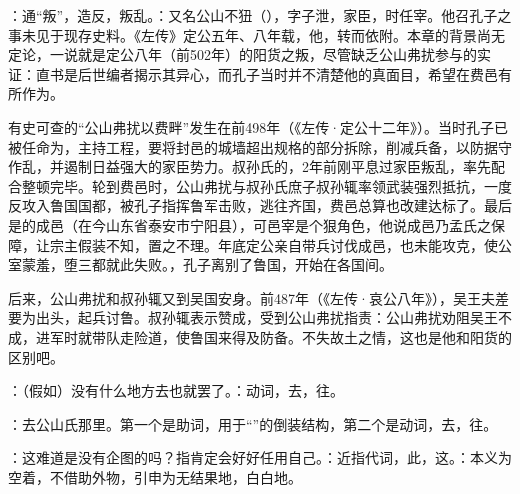 {
\begin{lyblobitemize}
\item {}：通“叛”，造反，叛乱。：又名公山不狃（），字子泄，家臣，时任宰。他召孔子之事未见于现存史料。《左传》定公五年、八年载，他，转而依附。本章的背景尚无定论，一说就是定公八年（前502年）的阳货之叛，尽管缺乏公山弗扰参与的实证：直书是后世编者揭示其异心，而孔子当时并不清楚他的真面目，希望在费邑有所作为。%

有史可查的“公山弗扰以费畔”发生在前498年（《左传·定公十二年》）。当时孔子已被任命为，主持工程，要将封邑的城墙超出规格的部分拆除，削减兵备，以防据守作乱，并遏制日益强大的家臣势力。叔孙氏的，2年前刚平息过家臣叛乱，率先配合整顿完毕。轮到费邑时，公山弗扰与叔孙氏庶子叔孙辄率领武装强烈抵抗，一度反攻入鲁国国都，被孔子指挥鲁军击败，逃往齐国，费邑总算也改建达标了。最后是的成邑（在今山东省泰安市宁阳县），可邑宰是个狠角色，他说成邑乃孟氏之保障，让宗主假装不知，置之不理。年底定公亲自带兵讨伐成邑，也未能攻克，使公室蒙羞，堕三都就此失败。，孔子离别了鲁国，开始在各国间。

后来，公山弗扰和叔孙辄又到吴国安身。前487年（《左传·哀公八年》），吴王夫差要为出头，起兵讨鲁。叔孙辄表示赞成，受到公山弗扰指责：公山弗扰劝阻吴王不成，进军时就带队走险道，使鲁国来得及防备。不失故土之情，这也是他和阳货的区别吧。

\item {}：（假如）没有什么地方去也就罢了。：动词，去，往。
\item {}：去公山氏那里。第一个是助词，用于“”的倒装结构，第二个是动词，去，往。
\item {}：这难道是没有企图的吗？指肯定会好好任用自己。：近指代词，此，这。：本义为空着，不借助外物，引申为无结果地，白白地。


\end{lyblobitemize}}
